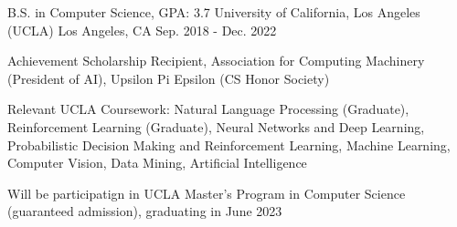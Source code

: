 

\begin{cventries}

  \cventry
    {B.S. in Computer Science, GPA: 3.7} %
    {University of California, Los Angeles (UCLA)} %
    {Los Angeles, CA} %
    {Sep. 2018 - Dec. 2022} %
    {
      \begin{cvitems} %
        \item {Achievement Scholarship Recipient, Association for Computing Machinery
        (President of AI), Upsilon Pi Epsilon (CS Honor Society)}
        \item {Relevant UCLA Coursework: Natural Language Processing (Graduate), Reinforcement Learning (Graduate),
        Neural Networks and Deep Learning, Probabilistic Decision Making and Reinforcement 
        Learning, Machine Learning, Computer Vision, Data Mining, Artificial Intelligence}
        \item {Will be participatign in UCLA Master's Program in Computer Science
        (guaranteed admission), graduating in June 2023}
      \end{cvitems}
    }

\end{cventries}

